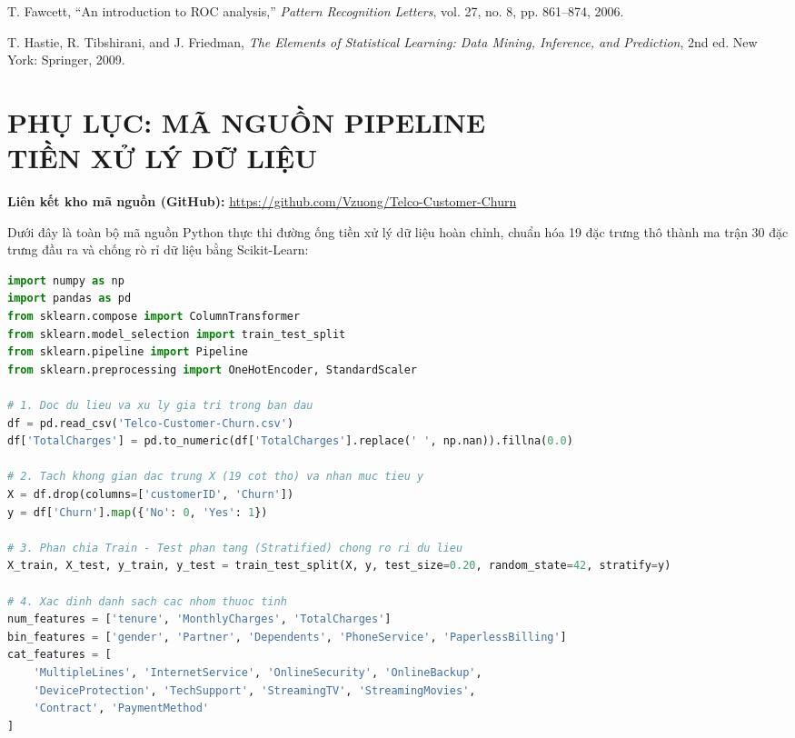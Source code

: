 \documentclass[a4paper]{article}
\begin{document}
{\begin{thebibliography}{99}
T. Fawcett, ``An introduction to ROC analysis,'' \textit{Pattern Recognition Letters}, vol. 27, no. 8, pp. 861--874, 2006.

T. Hastie, R. Tibshirani, and J. Friedman, \textit{The Elements of Statistical Learning: Data Mining, Inference, and Prediction}, 2nd ed. New York: Springer, 2009.

\end{thebibliography}

\vspace{1.5em}
\section*{\textbf{PHỤ LỤC: MÃ NGUỒN PIPELINE\\TIỀN XỬ LÝ DỮ LIỆU}}

\noindent \textbf{Liên kết kho mã nguồn (GitHub):} \url{https://github.com/Vzuong/Telco-Customer-Churn}

Dưới đây là toàn bộ mã nguồn Python thực thi đường ống tiền xử lý dữ liệu hoàn chỉnh, chuẩn hóa 19 đặc trưng thô thành ma trận 30 đặc trưng đầu ra và chống rò rỉ dữ liệu bằng Scikit-Learn:

\begin{lstlisting}[language=Python, caption={Mã nguồn Python xây dựng đường ống tiền xử lý chống rò rỉ dữ liệu}]
import numpy as np
import pandas as pd
from sklearn.compose import ColumnTransformer
from sklearn.model_selection import train_test_split
from sklearn.pipeline import Pipeline
from sklearn.preprocessing import OneHotEncoder, StandardScaler

# 1. Doc du lieu va xu ly gia tri trong ban dau
df = pd.read_csv('Telco-Customer-Churn.csv')
df['TotalCharges'] = pd.to_numeric(df['TotalCharges'].replace(' ', np.nan)).fillna(0.0)

# 2. Tach khong gian dac trung X (19 cot tho) va nhan muc tieu y
X = df.drop(columns=['customerID', 'Churn'])
y = df['Churn'].map({'No': 0, 'Yes': 1})

# 3. Phan chia Train - Test phan tang (Stratified) chong ro ri du lieu
X_train, X_test, y_train, y_test = train_test_split(X, y, test_size=0.20, random_state=42, stratify=y)

# 4. Xac dinh danh sach cac nhom thuoc tinh
num_features = ['tenure', 'MonthlyCharges', 'TotalCharges']
bin_features = ['gender', 'Partner', 'Dependents', 'PhoneService', 'PaperlessBilling']
cat_features = [
    'MultipleLines', 'InternetService', 'OnlineSecurity', 'OnlineBackup',
    'DeviceProtection', 'TechSupport', 'StreamingTV', 'StreamingMovies',
    'Contract', 'PaymentMethod'
]


\end{lstlisting}}
\end{document}
